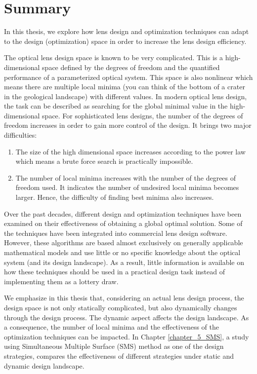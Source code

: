 \chapter*{Summary}

In this thesis, we explore how lens design and optimization techniques can adapt to the design (optimization) space in order to increase the lens design efficiency. 

The optical lens design space is known to be very complicated. This is a high-dimensional space defined by the degrees of freedom and the quantified performance of a parameterized optical system. This space is also nonlinear which means there are multiple local minima (you can think of the bottom of a crater in the geological landscape) with different values. In modern optical lens design, the task can be described as searching for the global minimal value in the high-dimensional space. For sophisticated lens designs, the number of the degrees of freedom increases in order to gain more control of the design. It brings two major difficulties:  
\begin{enumerate}[nosep]
\item The size of the high dimensional space increases according to the power law which means a brute force search is practically impossible. 
\item The number of local minima increases with the number of the degrees of freedom used. It indicates the number of undesired local minima becomes larger. Hence, the difficulty of finding best minima also increases.  


\end{enumerate}

Over the past decades, different design and optimization techniques have been examined on their effectiveness of obtaining a global optimal solution. Some of the techniques have been integrated into commercial lens design software. However, these algorithms are based almost exclusively on generally applicable mathematical models and use little or no specific knowledge about the optical system (and its design landscape). As a result, little information is available on how these techniques should be used in a practical design task instead of implementing them as a lottery draw. 

We emphasize in this thesis that, considering an actual lens design process, the design space is not only statically complicated, but also dynamically changes through the design process. The dynamic aspect affects the design landscape. As a consequence, the number of local minima and the effectiveness of the optimization techniques can be impacted. In Chapter \ref{chapter_5_SMS}, a study using Simultaneous Multiple Surface (SMS) method as one of the design strategies, compares the effectiveness of different strategies under static and dynamic design landscape.

